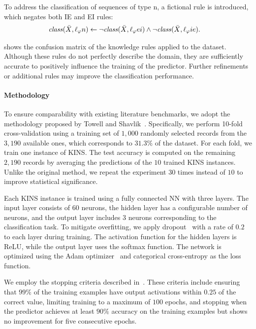 To address the classification of sequences of type \gls{n}, a fictional rule is introduced, which negates both \gls{IE} and \gls{EI} rules:
%
\begin{align}
    \mathit{class}(\bar{X}, \ell_{\varphi}{n}) &\leftarrow \neg \mathit{class}(\bar{X}, \ell_{\varphi}{ei}) \land \neg \mathit{class}(\bar{X}, \ell_{\varphi}{ie}).
\end{align}

 shows the confusion matrix of the knowledge rules applied to the dataset.
%
Although these rules do not perfectly describe the domain, they are sufficiently accurate to positively influence the training of the predictor.
%
Further refinements or additional rules may improve the classification performance.


\paragraph{Methodology}\label{par:kins-psjgs-methodology}
%
To ensure comparability with existing literature benchmarks, we adopt the methodology proposed by Towell and Shavlik~\cite{DBLP:journals/ai/TowellS94}.
%
Specifically, we perform 10-fold cross-validation using a training set of $1,000$ randomly selected records from the $3,190$ available ones, which corresponds to $31.3\%$ of the dataset.
%
For each fold, we train one instance of \gls{KINS}.
%
The test accuracy is computed on the remaining $2,190$ records by averaging the predictions of the $10$ trained \gls{KINS} instances.
%
Unlike the original method, we repeat the experiment $30$ times instead of $10$ to improve statistical significance.

Each \gls{KINS} instance is trained using a fully connected \gls{NN} with three layers.
%
The input layer consists of $60$ neurons, the hidden layer has a configurable number of neurons, and the output layer includes $3$ neurons corresponding to the classification task.
%
To mitigate overfitting, we apply dropout~\cite{DBLP:journals/jmlr/SrivastavaHKSS14} with a rate of $0.2$ to each layer during training.
%
The activation function for the hidden layers is \gls{ReLU}, while the output layer uses the softmax function.
%
The network is optimized using the Adam optimizer~\cite{DBLP:journals/corr/KingmaB14} and categorical cross-entropy as the loss function.

We employ the stopping criteria described in~\cite{DBLP:journals/ai/TowellS94}.
%
These criteria include ensuring that $99\%$ of the training examples have output activations within $0.25$ of the correct value, limiting training to a maximum of $100$ epochs, and stopping when the predictor achieves at least $90\%$ accuracy on the training examples but shows no improvement for five consecutive epochs.

